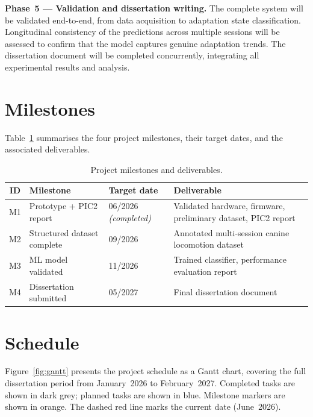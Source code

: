 \textbf{Phase~5 — Validation and dissertation writing.}
The complete system will be validated end-to-end, from data acquisition to
adaptation state classification.
Longitudinal consistency of the predictions across multiple sessions will be
assessed to confirm that the model captures genuine adaptation trends.
The dissertation document will be completed concurrently, integrating all
experimental results and analysis.

\section{Milestones}
\label{section:milestones}

Table~\ref{tab:milestones} summarises the four project milestones, their
target dates, and the associated deliverables.

\begin{table}[h]
  \centering
  \caption{Project milestones and deliverables.}
  \label{tab:milestones}
  \begin{tabular}{cp{3.8cm}p{2.8cm}p{5.0cm}}
    \toprule
    \textbf{ID} & \textbf{Milestone} & \textbf{Target date} & \textbf{Deliverable} \\
    \midrule
    M1 & Prototype + PIC2 report
       & 06/2026 \textit{(completed)}
       & Validated hardware, firmware, preliminary dataset, PIC2 report \\
    M2 & Structured dataset complete
       & 09/2026
       & Annotated multi-session canine locomotion dataset \\
    M3 & ML model validated
       & 11/2026
       & Trained classifier, performance evaluation report \\
    M4 & Dissertation submitted
       & 05/2027
       & Final dissertation document \\
    \bottomrule
  \end{tabular}
\end{table}

\section{Schedule}
\label{section:schedule}

Figure~\ref{fig:gantt} presents the project schedule as a Gantt chart,
covering the full dissertation period from January~2026 to February~2027.
Completed tasks are shown in dark grey; planned tasks are shown in blue.
Milestone markers are shown in orange.
The dashed red line marks the current date (June~2026).

